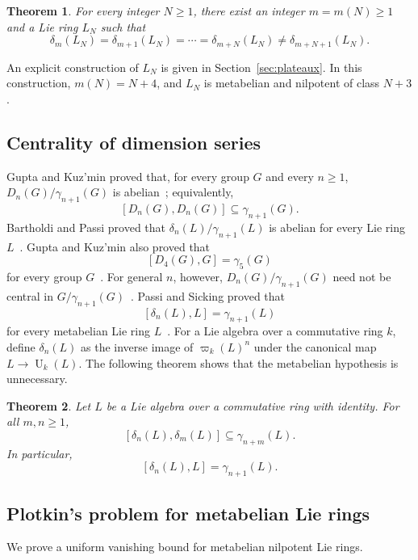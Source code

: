 \documentclass[a4paper,11pt,reqno]{amsart}
\newtheorem{maintheorem}{Theorem}
\theoremstyle{definition}
\newcommand{\U}{\operatorname U}
\begin{document}
\begin{maintheorem}\label{thm:A}
For every integer $N\geq1$, there exist an integer $m=m(N)\geq1$ and a Lie
ring $L_N$ such that
\[
 \delta_m(L_N)=\delta_{m+1}(L_N)=\cdots=\delta_{m+N}(L_N)
 \neq\delta_{m+N+1}(L_N).
\]
\end{maintheorem}

An explicit construction of $L_N$ is given in
Section~\ref{sec:plateaux}.  In this construction, $m(N)=N+4$, and $L_N$
is metabelian and nilpotent of class $N+3$.

\subsection{Centrality of dimension series}

Gupta and Kuz'min proved that, for every group $G$ and every $n\geq1$,
$D_n(G)/\gamma_{n+1}(G)$ is abelian~\cite{GuptaKuzmin1992}; equivalently,
\[
                    [D_n(G),D_n(G)]\subseteq\gamma_{n+1}(G).
\]
Bartholdi and Passi proved that
$\delta_n(L)/\gamma_{n+1}(L)$ is abelian for every Lie ring
$L$~\cite{BartholdiPassi2015}.  Gupta and Kuz'min also proved that
\[
                         [D_4(G),G]=\gamma_5(G)
\]
for every group $G$~\cite{GuptaKuzmin1992}.  For general $n$, however,
$D_n(G)/\gamma_{n+1}(G)$ need not be central in
$G/\gamma_{n+1}(G)$~\cite{GuptaKuzmin1995}.  Passi and Sicking proved
that
\[
                         [\delta_n(L),L]=\gamma_{n+1}(L)
\]
for every metabelian Lie ring $L$~\cite{PassiSicking2017}.  For a Lie
algebra over a commutative ring $k$, define $\delta_n(L)$ as
the inverse image of $\varpi_k(L)^n$ under the canonical map
$L\to\U_k(L)$.  The following theorem shows that the metabelian hypothesis
is unnecessary.

\begin{maintheorem}\label{thm:B}
Let $L$ be a Lie algebra over a commutative ring with identity.  For all
$m,n\geq1$,
\[
                 [\delta_n(L),\delta_m(L)]\subseteq\gamma_{n+m}(L).
\]
In particular,
\[
                       [\delta_n(L),L]=\gamma_{n+1}(L).
\]
\end{maintheorem}

\subsection{Plotkin's problem for metabelian Lie rings}

We prove a uniform vanishing bound for metabelian nilpotent Lie rings.
\end{document}
